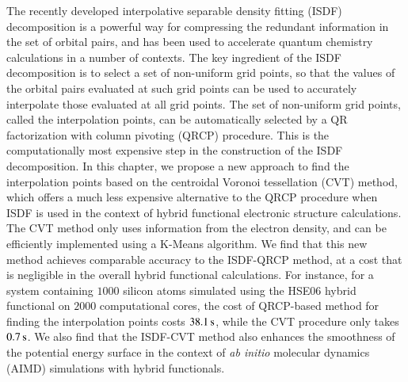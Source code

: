 The recently developed interpolative separable density fitting (ISDF)
decomposition is a powerful way for compressing the redundant information in the
set of orbital pairs, and has been used to accelerate quantum chemistry
calculations in a number of contexts. The key ingredient of the ISDF
decomposition is to select a set of non\hyp{}uniform grid points, so that the
values of the orbital pairs evaluated at such grid points can be used to
accurately interpolate those evaluated at all grid points. The set of
non\hyp{}uniform grid points, called the interpolation points, can be
automatically selected by a QR factorization with column pivoting (QRCP)
procedure. This is the computationally most expensive step in the construction
of the ISDF decomposition. In this chapter, we propose a new approach to find
the interpolation points based on the centroidal Voronoi tessellation (CVT)
method, which offers a much less expensive alternative to the QRCP procedure
when ISDF is used in the context of hybrid functional electronic structure
calculations. The CVT method only uses information from the electron density,
and can be efficiently implemented using a K\hyp{}Means algorithm. We find that
this new method achieves comparable accuracy to the ISDF\hyp{}QRCP method, at a
cost that is negligible in the overall hybrid functional calculations. For
instance, for a system containing $1000$ silicon atoms simulated using the HSE06
hybrid functional on $2000$ computational cores, the cost of QRCP\hyp{}based
method for finding the interpolation points costs $38.1\operatorname{s}$, while the CVT
procedure only takes $0.7\operatorname{s}$.  We also find that the ISDF\hyp{}CVT method also
enhances the smoothness of the potential energy surface in the context of 
\emph{ab initio} molecular dynamics (AIMD) simulations with hybrid functionals.
